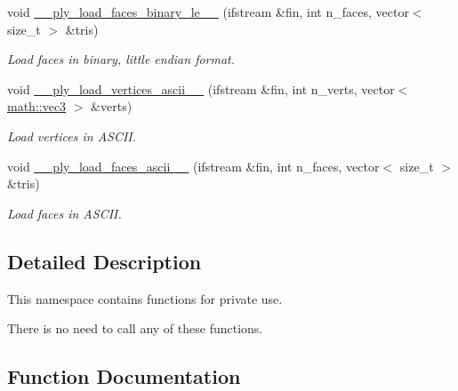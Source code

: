\begin{DoxyCompactItemize}
\mbox{\label{namespacephysim_1_1input_1_1input__private_ab107468bc09cd1ac542e4ea65c49d07c}} 
void \hyperlink{namespacephysim_1_1input_1_1input__private_ab107468bc09cd1ac542e4ea65c49d07c}{\+\_\+\+\_\+ply\+\_\+load\+\_\+faces\+\_\+binary\+\_\+le\+\_\+\_} (ifstream \&fin, int n\+\_\+faces, vector$<$ size\+\_\+t $>$ \&tris)
\begin{DoxyCompactList}\small\item\em Load faces in binary, little endian format. \end{DoxyCompactList}\item 
\mbox{\label{namespacephysim_1_1input_1_1input__private_a3af6652f88ef9e889e48a7e4f72a8611}} 
void \hyperlink{namespacephysim_1_1input_1_1input__private_a3af6652f88ef9e889e48a7e4f72a8611}{\+\_\+\+\_\+ply\+\_\+load\+\_\+vertices\+\_\+ascii\+\_\+\_} (ifstream \&fin, int n\+\_\+verts, vector$<$ \hyperlink{structphysim_1_1math_1_1vec3}{math\+::vec3} $>$ \&verts)
\begin{DoxyCompactList}\small\item\em Load vertices in A\+S\+C\+II. \end{DoxyCompactList}\item 
\mbox{\label{namespacephysim_1_1input_1_1input__private_a176b0dd04828268bb3cee9a776a2f351}} 
void \hyperlink{namespacephysim_1_1input_1_1input__private_a176b0dd04828268bb3cee9a776a2f351}{\+\_\+\+\_\+ply\+\_\+load\+\_\+faces\+\_\+ascii\+\_\+\_} (ifstream \&fin, int n\+\_\+faces, vector$<$ size\+\_\+t $>$ \&tris)
\begin{DoxyCompactList}\small\item\em Load faces in A\+S\+C\+II. \end{DoxyCompactList}\end{DoxyCompactItemize}


\subsection{Detailed Description}
This namespace contains functions for private use. 

There is no need to call any of these functions. 

\subsection{Function Documentation}
\mbox{\label{namespacephysim_1_1input_1_1input__private_a9bf525ab1bb178cfe1de59c6a91b6554}} 
